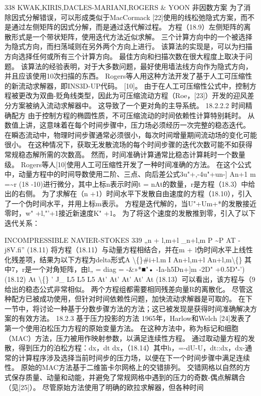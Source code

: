 \documentclass[UTF8,11pt,a4paper,openany,fontset=fandol]{ctexbook}
\begin{document}
338 KWAK,KIRIS,DACLES-MARIANI,ROGERS \& YOON 非因数方案 为了消除因式分解错误，可以形成类似于MacCormack [22]使用的线松弛隐式方案，而不是通过左侧矩阵的因式分解，而是通过迭代解过程。 方程（18.9）左侧矩阵的离散形式是一个带状矩阵，使用迭代方法近似求解。 三个计算方向中的一个被选择为隐式方向，而扫荡域则在另外两个方向上进行。 该算法的实现是，可以为扫描方向选择任何或所有三个计算方向。 最佳方向和扫描次数在很大程度上取决于问题。 该算法的经验表明，对于大多数问题，最好使用墙法线方向作为隐式方向，并且应该使用10次扫描的东西。 Rogers等人用这种方法开发了基于人工可压缩性的新流动求解器，即INS3D-UP代码。 [10]。 由于在人工可压缩性公式中，控制方程被更改为双曲-贬角线类型，因此为可压缩流动方程（Roe，[23]）开发的迎风差分方案被纳入流动求解器中。 这导致了一个更对角的主导系统。 18.2.2.2 时间精确配方 由于控制方程的椭圆性质，不可压缩流动的时间依赖性计算特别耗时。 从数值上讲，这意味着在每个时间步骤中，压力场必须经历一次完整的稳态迭代。 在瞬态流动中，物理时间步骤通常必须很小，每次时间增量期间流动场的变化可能很小。 在这种情况下，获取无发散流场的每个时间步骤的迭代次数可能不如获得常规稳态解所需的次数高。 然而，时间准确计算通常比稳态计算耗时一个数量级。 Rogers等人[10]使用人工可压缩性开发了一种时间准确的方法。 在这个公式中，动量方程中的时间导数使用二阶、三点、向后差公式3u"+,-4u"+un-] An+1 m =\textasciitilde{}r (18 -10)进行微分，其中上标n表示时间t = nAt的数量，r是方程（18.3）中给出的右侧。 为了求解在（n +1）时间水平下发散自由速度的方程（18.10），引入了一个伪时间水平，并用上标m表示。 方程是迭代解的，当U"+Um+*的发散接近零时，w" +l,"'+1接近新速度K" +1。 为了将这个速度的发散推到零，引入了以下迭代关系：

INCOMPRESSIBLE NAVIER-STOKES 339 „n + l,m+l \_n+l,m P \textasciitilde{}P AT -j8V.fi” (18.11) 将方程（18.11）与动量方程相结合，并在m + l伪时间水平上线性化残差项，结果为以下方程为delta形式A \textbackslash\{\}\#i+l.m I An+l,m+l An+l,m\textbackslash\{\} 其中7，r是一个对角矩阵，由l„ = diag = -\&»*■"• -Ia-h5Dn+]m -2D" +0.5D"-') (18.12) At \textbackslash\{\} ' J\_ L5 L5 L5 At' At' At' At' At (18.13）可以看出，该方程与（9给出的稳态公式非常相似。 两个方程组都需要相同残差向量R的离散化。 尽管这种配方已被成功使用，但针对时间依赖性问题，加快流动求解器是可取的。 在下一节中，将讨论一种基于分数步骤方法的方法；这已被发现是获得时间准确解决方案的有效方法。 18.2.3 基于压力投影的方法 1965年，Harlow和Welch [24]发表了第一个使用泊松压力方程的原始变量方法。 在这种方法中，称为标记和细胞（MAC）方法，压力被用作映射参数，以满足连续性方程。 通过取动量方程的发散，得到压力的泊松方程：dx，dt dx，（18.14）其中h，=-dU-U，dt::dx，dx-通常的计算程序涉及选择当前时间步的压力场，以便在下一个时间步骤中满足连续性。 原始的MAC方法基于二维笛卡尔网格上的交错排列。 交错网格以自然的方式保存质量、动量和动能，并避免了常规网格中遇到的压力的奇数-偶点解耦合（见[25]）。 尽管原始方法使用了明确的欧拉求解器，但各种时间
\end{document}
